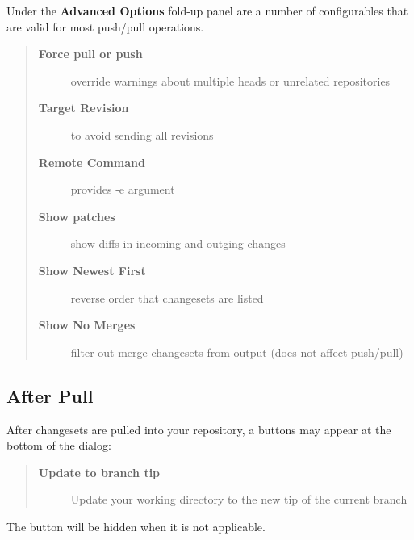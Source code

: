 \documentclass[letterpaper,10pt,english]{manual}
\begin{document}
Under the \textbf{Advanced Options} fold-up panel are a number of
configurables that are valid for most push/pull operations.
\begin{quote}
\begin{description}
\item[\textbf{Force pull or push}]
override warnings about multiple heads or unrelated repositories

\item[\textbf{Target Revision}]
to avoid sending all revisions

\item[\textbf{Remote Command}]
provides -e argument

\item[\textbf{Show patches}]
show diffs in incoming and outging changes

\item[\textbf{Show Newest First}]
reverse order that changesets are listed

\item[\textbf{Show No Merges}]
filter out merge changesets from output (does not affect push/pull)

\end{description}
\end{quote}


\subsection{After Pull}

After changesets are pulled into your repository, a buttons may appear
at the bottom of the dialog:
\begin{quote}
\begin{description}
\item[\textbf{Update to branch tip}]
Update your working directory to the new tip of the current branch

\end{description}
\end{quote}

The button will be hidden when it is not applicable.
\end{document}
